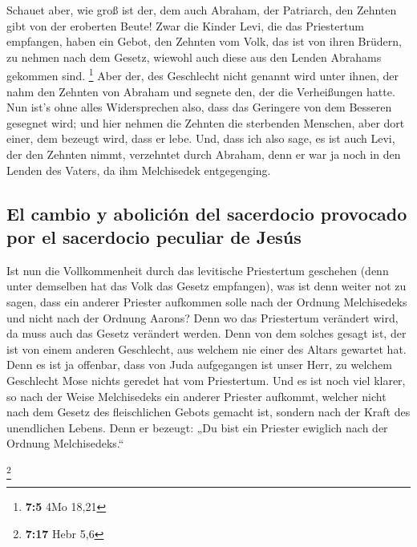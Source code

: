  Schauet aber, wie groß ist der, dem auch Abraham, der
Patriarch, den Zehnten gibt von der eroberten Beute!  Zwar
die Kinder Levi, die das Priestertum empfangen, haben ein Gebot, den
Zehnten vom Volk, das ist von ihren Brüdern, zu nehmen nach dem Gesetz,
wiewohl auch diese aus den Lenden Abrahams gekommen sind. \footnote{\textbf{7:5}
  4Mo 18,21}  Aber der, des Geschlecht nicht genannt wird
unter ihnen, der nahm den Zehnten von Abraham und segnete den, der die
Verheißungen hatte.  Nun ist's ohne alles Widersprechen
also, dass das Geringere von dem Besseren gesegnet wird; 
und hier nehmen die Zehnten die sterbenden Menschen, aber dort einer,
dem bezeugt wird, dass er lebe.  Und, dass ich also sage,
es ist auch Levi, der den Zehnten nimmt, verzehntet durch Abraham,
 denn er war ja noch in den Lenden des Vaters, da ihm
Melchisedek entgegenging.

\hypertarget{el-cambio-y-aboliciuxf3n-del-sacerdocio-provocado-por-el-sacerdocio-peculiar-de-jesuxfas}{%
\subsection{El cambio y abolición del sacerdocio provocado por el
sacerdocio peculiar de
Jesús}\label{el-cambio-y-aboliciuxf3n-del-sacerdocio-provocado-por-el-sacerdocio-peculiar-de-jesuxfas}}

 Ist nun die Vollkommenheit durch das levitische
Priestertum geschehen (denn unter demselben hat das Volk das Gesetz
empfangen), was ist denn weiter not zu sagen, dass ein anderer Priester
aufkommen solle nach der Ordnung Melchisedeks und nicht nach der Ordnung
Aarons?  Denn wo das Priestertum verändert wird, da muss
auch das Gesetz verändert werden.  Denn von dem solches
gesagt ist, der ist von einem anderen Geschlecht, aus welchem nie einer
des Altars gewartet hat.  Denn es ist ja offenbar, dass
von Juda aufgegangen ist unser Herr, zu welchem Geschlecht Mose nichts
geredet hat vom Priestertum.  Und es ist noch viel
klarer, so nach der Weise Melchisedeks ein anderer Priester aufkommt,
 welcher nicht nach dem Gesetz des fleischlichen Gebots
gemacht ist, sondern nach der Kraft des unendlichen Lebens.
 Denn er bezeugt: „Du bist ein Priester ewiglich nach der
Ordnung Melchisedeks.``

\footnote{\textbf{7:17} Hebr 5,6}

